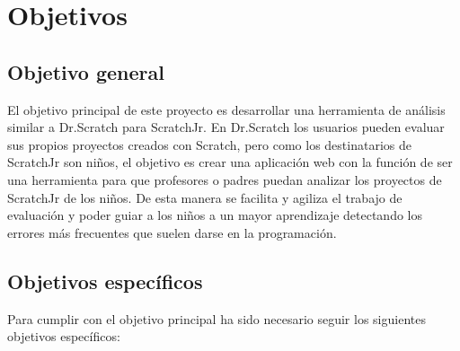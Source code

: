 \documentclass[a4paper, 12pt]{book}
\begin{document}

\cleardoublepage %
\chapter{Objetivos} %
\label{chap:objetivos} %

\section{Objetivo general} %
\label{sec:objetivo-general} %

El objetivo principal de este proyecto es desarrollar una herramienta de análisis similar a Dr.Scratch para ScratchJr.
En Dr.Scratch los usuarios pueden evaluar sus propios proyectos creados con Scratch, pero como los destinatarios de ScratchJr son niños, el objetivo es crear una aplicación web con la función de ser una herramienta para que profesores o padres puedan analizar los proyectos de ScratchJr de los niños.
De esta manera se facilita y agiliza el trabajo de evaluación y poder guiar a los niños a un mayor aprendizaje detectando los errores más frecuentes que suelen darse en la programación.


\section{Objetivos específicos}
\label{sec:objetivos-especificos}

Para cumplir con el objetivo principal ha sido necesario seguir los siguientes objetivos específicos:
\end{document}
